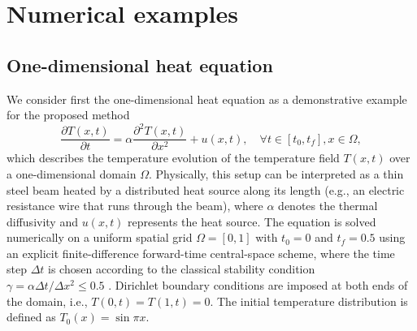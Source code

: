 \documentclass{article}
\begin{document}
\section{Numerical examples}
\label{sec:examples}
\subsection{One-dimensional heat equation}
\label{sec:heat}
We consider first the one-dimensional heat equation as a demonstrative example for the proposed method
\begin{equation}
    \label{eq:1d-heat}
    \frac{\partial T(x,t)}{\partial t} = \alpha \frac{\partial^2 T(x,t)}{\partial x^2}+u(x,t), \quad \forall t \in [t_0,t_f], x\in \Omega,
\end{equation}
which describes the temperature evolution of the temperature field $T(x,t)$ over a one-dimensional domain $\Omega$.
Physically, this setup can be interpreted as a thin steel beam heated by a distributed heat source along its length (e.g., an electric resistance wire that runs through the beam), where $\alpha$ denotes the thermal diffusivity and $u(x,t)$ represents the heat source.
The equation is solved numerically on a uniform spatial grid $\Omega=[0,1]$ with $t_0=0$ and $t_f=0.5$ using an explicit finite-difference forward-time central-space scheme, where the time step $\Delta t$ is chosen according to the classical stability condition $\gamma=\alpha \Delta t/\Delta x^2 \le 0.5$ \citep{Press2007FTCS}.
Dirichlet boundary conditions are imposed at both ends of the domain, i.e., $T(0,t)=T(1,t)=0$.
The initial temperature distribution is defined as $T_0(x) = \sin{\pi x}$.
\end{document}
